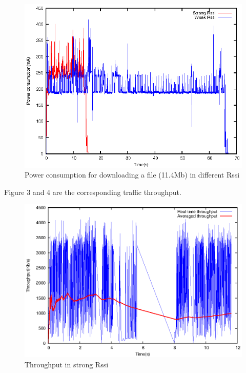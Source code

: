 \documentclass[journal]{IEEEtran}
\begin{document}
\begin{figure}
\centering
\includegraphics[scale=1]{energy_comparision.eps}
\caption{Power consumption for downloading a file (11.4Mb) in different Rssi}
\end{figure}

Figure 3 and 4 are the corresponding traffic throughput.

\begin{figure}
\centering
\includegraphics[scale=0.55]{strong_traffic.eps}
\caption{Throughput in strong Rssi}
\end{figure}
\end{document}
